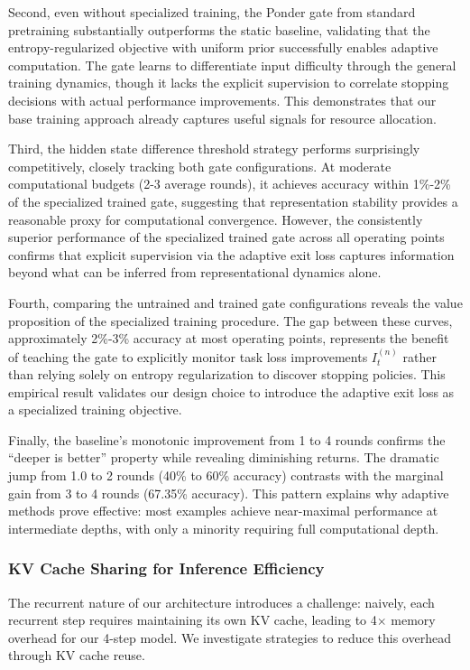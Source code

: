\documentclass[]{bytedance_seed}
\newcommand{\1}{\mathbf{1}}
\begin{document}
Second, even without specialized training, the Ponder gate from standard pretraining substantially outperforms the static baseline, validating that the entropy-regularized objective with uniform prior successfully enables adaptive computation. The gate learns to differentiate input difficulty through the general training dynamics, though it lacks the explicit supervision to correlate stopping decisions with actual performance improvements. This demonstrates that our base training approach already captures useful signals for resource allocation.

Third, the hidden state difference threshold strategy performs surprisingly competitively, closely tracking both gate configurations. At moderate computational budgets (2-3 average rounds), it achieves accuracy within 1\%-2\% of the specialized trained gate, suggesting that representation stability provides a reasonable proxy for computational convergence. However, the consistently superior performance of the specialized trained gate across all operating points confirms that explicit supervision via the adaptive exit loss captures information beyond what can be inferred from representational dynamics alone.

Fourth, comparing the untrained  and trained gate configurations reveals the value proposition of the specialized training procedure. The gap between these curves, approximately 2\%-3\% accuracy at most operating points, represents the benefit of teaching the gate to explicitly monitor task loss improvements $I^{(n)}_t$ rather than relying solely on entropy regularization to discover stopping policies. This empirical result validates our design choice to introduce the adaptive exit loss as a specialized training objective.

Finally, the baseline's monotonic improvement from 1 to 4 rounds confirms the ``deeper is better'' property while revealing diminishing returns. The dramatic jump from 1.0 to 2 rounds (40\% to 60\% accuracy) contrasts with the marginal gain from 3 to 4 rounds (67.35\% accuracy). This pattern explains why adaptive methods prove effective: most examples achieve near-maximal performance at intermediate depths, with only a minority requiring full computational depth. 

\subsubsection{KV Cache Sharing for Inference Efficiency}

The recurrent nature of our architecture introduces a challenge: naively, each recurrent step requires maintaining its own KV cache, leading to 4$\times$ memory overhead for our 4-step model. We investigate strategies to reduce this overhead through KV cache reuse.
\end{document}

